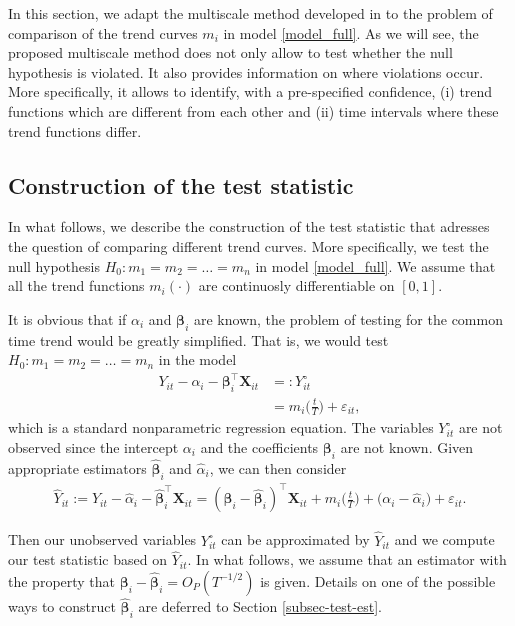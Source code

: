 \documentclass[a4paper,12pt]{article}
\begin{document}
In this section, we adapt the multiscale method developed in \cite{KhismatullinaVogt2018} to the problem of comparison of the trend curves $m_i$ in model \eqref{model_full}.  As we will see, the proposed multiscale method does not only allow to test whether the null hypothesis is violated. It also provides information on where violations occur. More specifically, it allows to identify, with a pre-specified confidence, (i) trend functions which are different from each other and (ii) time intervals where these trend functions differ.

\subsection{Construction of the test statistic}\label{subsec-test-stat}

In what follows, we describe the construction of the test statistic that adresses the question of comparing different trend curves. More specifically, we test the null hypothesis $H_0: m_1 = m_2 = \ldots = m_n$ in model \eqref{model_full}. We assume that all the trend functions $m_i(\cdot)$ are continuosly differentiable on $[0, 1]$.

It is obvious that if $\alpha_i$ and $\bm{\beta}_i$ are known, the problem of testing for the common time trend would be greatly simplified. That is, we would test $H_0: m_1 = m_2 = \ldots = m_n$ in the model
\begin{align*}
Y_{it} - \alpha_i - \bm{\beta}_i^\top \mathbf{X}_{it} & =: Y_{it}^\circ\\
					& = m_i \Big( \frac{t}{T} \Big) + \varepsilon_{it}, 
\end{align*}
which is a standard nonparametric regression equation. The variables $Y_{it}^\circ$ are not observed since the intercept $\alpha_i$ and the coefficients $\bm{\beta}_i$ are not known. Given appropriate estimators $\widehat{\bm{\beta}}_i$ and $\widehat{\alpha}_i$, we can then consider
\begin{align*}
	\widehat{Y}_{it} := Y_{it} -\widehat{\alpha}_i - \widehat{\bm{\beta}}_i^\top \mathbf{X}_{it} =(\bm{\beta}_i - \widehat{\bm{\beta}}_i)^\top \mathbf{X}_{it} + m_i \Big( \frac{t}{T} \Big) + \big( \alpha_i - \widehat{\alpha}_i \big) + \varepsilon_{it}. 
\end{align*}

Then our unobserved variables $Y_{it}^\circ$ can be approximated by $\widehat{Y}_{it}$ and we compute our test statistic based on $\widehat{Y}_{it}$. In what follows, we assume that an estimator with the property that $\bm{\beta}_i - \widehat{\bm{\beta}}_i = O_P(T^{-1/2})$ is given.  Details on one of the possible ways to construct $\widehat{\bm{\beta}}_i$ are deferred to Section \ref{subsec-test-est}.
\end{document}
